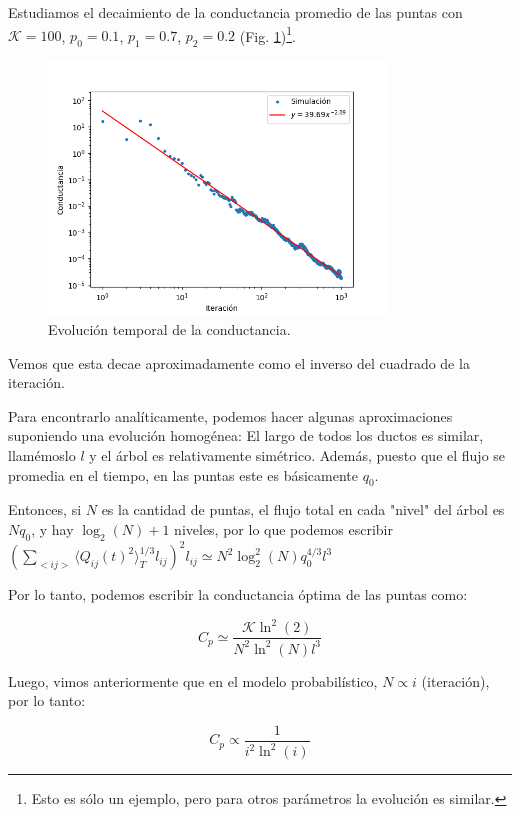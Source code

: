 \documentclass{article}
\begin{document}
Estudiamos el decaimiento de la conductancia promedio de las puntas con $\mathcal{K}=100$, $p_0 = 0.1$, $p_1 = 0.7$, $p_2 = 0.2$ (Fig. \ref{fig:evolucion_conductancia_proba})\footnote{Esto es sólo un ejemplo, pero para otros parámetros la evolución es similar.}.

\begin{figure}[h!]
    \centering
    \includegraphics[width=0.8\textwidth]{graficos_proba/Cij_vs_tiempo.png}
    \caption{Evolución temporal de la conductancia.}
    \label{fig:evolucion_conductancia_proba}
\end{figure}

Vemos que esta decae aproximadamente como el inverso del cuadrado de la iteración.

Para encontrarlo analíticamente, podemos hacer algunas aproximaciones suponiendo una evolución homogénea: El largo de todos los ductos es similar, llamémoslo $l$ y el árbol es relativamente simétrico. Además, puesto que el flujo se promedia en el tiempo, en las puntas este es básicamente $q_0$.

Entonces, si $N$ es la cantidad de puntas, el flujo total en cada "nivel" del árbol es $Nq_0$, y hay $\log_2(N)+1$ niveles, por lo que podemos escribir $\left( \sum_{<ij>} \langle Q_{ij}(t)^2\rangle_T^{1/3} l_{ij}\right)^2 l_{ij} \simeq N^{2}\log_2^{2}(N)q_0^{4/3}l^{3}$

Por lo tanto, podemos escribir la conductancia óptima de las puntas como:

$$ C_p \simeq \dfrac{\mathcal{K} \ln^2(2)}{N^{2}\ln^{2}(N)l^{3}} $$

Luego, vimos anteriormente que en el modelo probabilístico, $N \propto i$ (iteración), por lo tanto:

$$ C_p \propto \frac{1}{i^2 \ln^2(i)} $$
\end{document}

